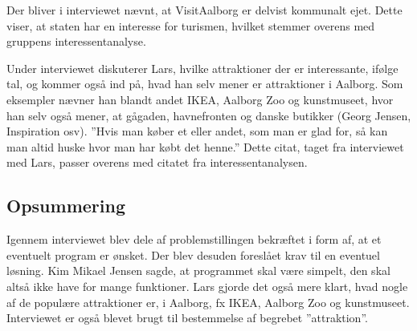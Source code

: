 Der bliver i interviewet nævnt, at VisitAalborg er delvist kommunalt ejet. Dette viser, at staten har en interesse for turismen, hvilket stemmer overens med gruppens interessentanalyse.

Under interviewet diskuterer Lars, hvilke attraktioner der er interessante, ifølge tal, og kommer også ind på, hvad han selv mener er attraktioner i Aalborg. Som eksempler nævner han blandt andet IKEA, Aalborg Zoo og kunstmuseet, hvor han selv også mener, at gågaden, havnefronten og danske butikker (Georg Jensen, Inspiration osv). ”Hvis man køber et eller andet, som man er glad for, så kan man altid huske hvor man har købt det henne.” Dette citat, taget fra interviewet med Lars, passer overens med citatet fra interessentanalysen.
\subsection{Opsummering}
Igennem interviewet blev dele af problemstillingen bekræftet i form af, at et eventuelt program er ønsket. Der blev desuden foreslået krav til en eventuel løsning. Kim Mikael Jensen sagde, at programmet skal være simpelt, den skal altså ikke have for mange funktioner. Lars gjorde det også mere klart, hvad nogle af de populære attraktioner er, i Aalborg, fx IKEA, Aalborg Zoo og kunstmuseet. Interviewet er også blevet brugt til bestemmelse af begrebet ”attraktion”. 